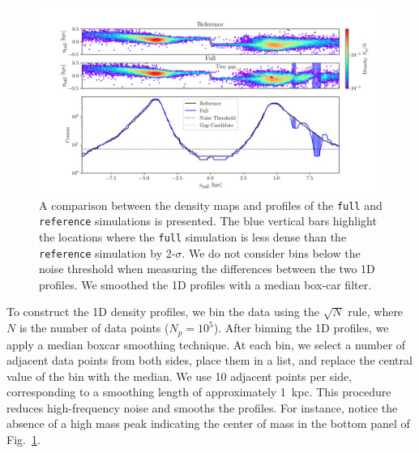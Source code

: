 \documentclass{aa}
\begin{document}
\begin{appendix}
    \begin{figure}
      \centering
      \includegraphics[width=\linewidth, trim=20 0 15 0]{monte-carlo-009-pouliasis2017pii-GCNBody-2000-milisigma-5-noisefactor-20-boxcarindexlength-shifted-0.png}
      \caption{A comparison between the density maps and profiles of the \texttt{full} and \texttt{reference} simulations is presented. The blue vertical bars highlight the locations where the \texttt{full} simulation is less dense than the \texttt{reference} simulation by 2-$\sigma$. We do not consider bins below the noise threshold when measuring the differences between the two 1D profiles. We smoothed the 1D profiles with a median box-car filter.}
      \label{fig:profiles}
      \end{figure}

    To construct the 1D density profiles, we bin the data using the $\sqrt{N}$ rule, where $N$ is the number of data points ($N_p = 10^5$). After binning the 1D profiles, we apply a median boxcar smoothing technique. At each bin, we select a number of adjacent data points from both sides, place them in a list, and replace the central value of the bin with the median. We use 10 adjacent points per side, corresponding to a smoothing length of approximately 1~kpc. This procedure reduces high-frequency noise and smooths the profiles. For instance, notice the absence of a high mass peak indicating the center of mass in the bottom panel of Fig.~\ref{fig:profiles}.


\end{appendix}
\end{document}
